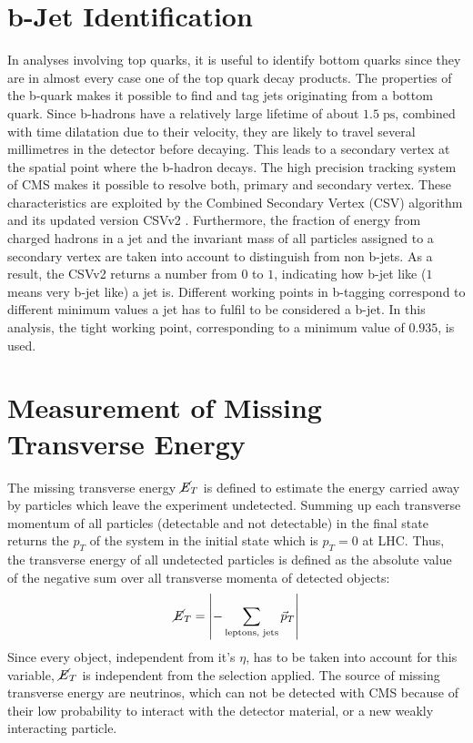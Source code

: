 \section{b-Jet Identification}
\label{sec:btag}
	In analyses involving top quarks, it is useful to identify bottom quarks since they are in almost every case one of the top quark decay products. The properties of the b-quark makes it possible to find and tag jets originating from a bottom quark. Since b-hadrons have a relatively large lifetime of about $1.5\;\text{ps}$, combined with time dilatation due to their velocity, they are likely to travel several millimetres in the detector before decaying. This leads to a secondary vertex at the spatial point where the b-hadron decays. The high precision tracking system of CMS makes it possible to resolve both, primary and secondary vertex. These characteristics are exploited by the Combined Secondary Vertex (CSV) algorithm \cite{csv} and its updated version CSVv2 \cite{btag}. Furthermore, the fraction of energy from charged hadrons in a jet and the invariant mass of all particles assigned to a secondary vertex are taken into account to distinguish from non b-jets. As a result, the CSVv2 returns a number from $0$ to $1$, indicating how b-jet like ($1$ means very b-jet like) a jet is. Different working points \cite{btagperf} in b-tagging correspond to different minimum values a jet has to fulfil to be considered a b-jet. In this analysis, the tight working point, corresponding to a minimum value of $0.935$, is used. 
	
\section{Measurement of Missing Transverse Energy}
	The missing transverse energy $\cancel{E}_T$ is defined to estimate the energy carried away by particles which leave the experiment undetected. Summing up each transverse momentum of all particles (detectable and not detectable) in the final state returns the $p_T$ of the system in the initial state which is $p_T = 0$ at LHC. Thus, the transverse energy of all undetected particles is defined as the absolute value of the negative sum over all transverse momenta of detected objects:
	\begin{equation}
		\cancel{E}_T = \left| - \sum_{\textrm{leptons, jets}}^{} \vec{p}_T \right|
		\label{eq:MET}
	\end{equation}	
	Since every object, independent from it's $\eta$, has to be taken into account for this variable, $\cancel{E}_T$ is independent from the selection applied. The source of missing transverse energy are neutrinos, which can not be detected with CMS because of their low probability to interact with the detector material, or a new weakly interacting particle. 

